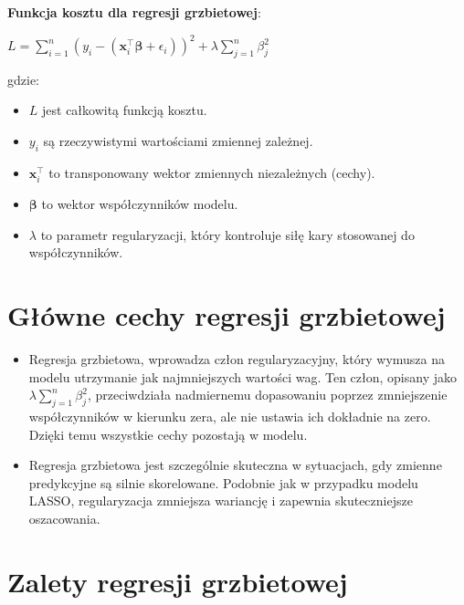     \textbf{Funkcja kosztu dla regresji grzbietowej}: 
    \begin{center}
        $L = \sum_{i=1}^{n} (y_i - (\boldsymbol{x}_i^{\top} \boldsymbol{\beta} + \epsilon_i))^2 + \lambda \sum_{j=1}^{n} \beta_j^2$
    \end{center}

gdzie:
\begin{itemize}
\setlength\itemsep{-0.5em}
 \item  $L$ jest całkowitą funkcją kosztu.
 \item  $y_i$ są rzeczywistymi wartościami zmiennej zależnej.

 \item  $\boldsymbol{x}_i^{\top}$ to transponowany wektor zmiennych niezależnych (cechy).

 \item  $\boldsymbol{\beta}$ to wektor współczynników modelu.

 \item  $\lambda$ to parametr regularyzacji, który kontroluje siłę kary stosowanej do współczynników.
\end{itemize}
\item 

{}
\section*{Główne cechy regresji grzbietowej}
\vspace{-1.0em}
\label{sec:why_use_ml}


\begin{itemize}
\item Regresja grzbietowa, wprowadza człon regularyzacyjny, który wymusza na modelu utrzymanie jak najmniejszych wartości wag. Ten człon, opisany jako $\lambda \sum_{j=1}^{n} \beta_j^2$, przeciwdziała nadmiernemu dopasowaniu poprzez zmniejszenie współczynników w kierunku zera, ale nie ustawia ich dokładnie na zero. Dzięki temu wszystkie cechy pozostają w modelu.

\item Regresja grzbietowa jest szczególnie skuteczna w sytuacjach, gdy zmienne predykcyjne są silnie skorelowane. Podobnie jak w przypadku modelu LASSO, regularyzacja zmniejsza wariancję i zapewnia skuteczniejsze oszacowania.
\end{itemize}

{}
\section*{Zalety regresji grzbietowej}
\vspace{-1.0em}
\label{sec:ml_challenges}


